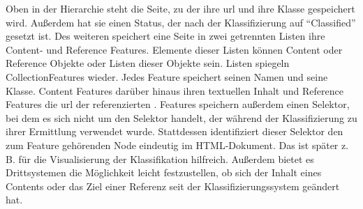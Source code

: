         Oben in der Hierarchie steht die Seite,
        zu der ihre \gls{url} und ihre Klasse gespeichert wird.
        Außerdem hat sie einen Status, der nach der Klassifizierung auf
        "`Classified"' gesetzt ist.
        Des weiteren speichert eine Seite in zwei getrennten Listen ihre
        Content- und Reference Features.
        Elemente dieser Listen können Content oder Reference Objekte oder Listen
        dieser Objekte sein. Listen spiegeln CollectionFeatures wieder.
        Jedes Feature speichert seinen Namen und seine Klasse.
        Content Features darüber hinaus ihren textuellen Inhalt %
        und Reference Features die \gls{url} der referenzierten {\resource}.
        Features speichern außerdem einen Selektor, bei dem es sich nicht um den Selektor
        handelt, der während der Klassifizierung zu ihrer Ermittlung verwendet wurde.
        Stattdessen identifiziert dieser Selektor den zum Feature gehörenden Node eindeutig im HTML-Dokument.
        Das ist später z. B. für die Visualisierung der Klassifikation hilfreich.
        Außerdem bietet es Drittsystemen die Möglichkeit leicht festzustellen,
        ob sich der Inhalt eines Contents oder das Ziel einer Referenz seit der Klassifizierungssystem
        geändert hat.
